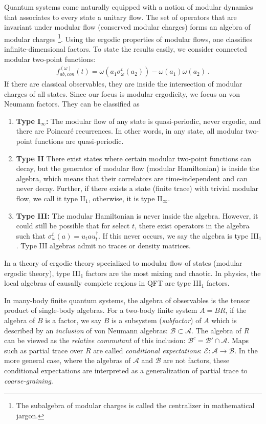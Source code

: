 \documentclass[a4paper,11pt]{article}
\theoremstyle{definition}
\theoremstyle{remark}
\newcommand{\mA}{\mathcal{A}}
\newcommand{\mB}{\mathcal{B}}
\newcommand{\mE}{\mathcal{E}}
\begin{document}
Quantum systems come naturally equipped with a notion of modular dynamics that associates to every state a unitary flow. The set of operators that are invariant under modular flow (conserved modular charges) forms an algebra of modular charges \footnote{The subalgebra of modular charges is called {the centralizer} in mathematical jargon.}. Using the ergodic properties of modular flows, one classifies infinite-dimensional factors. To state the results easily, we consider connected modular two-point functions:
\begin{align}
    f_{ab,con}^{(\omega)}(t)=\omega(a_1 \sigma_\omega^t(a_2))-\omega(a_1)\omega(a_2)\ .
\end{align}
If there are classical observables, they are inside the intersection of modular charges of all states. Since our focus is modular ergodicity, we focus on von Neumann factors. They can be classified as
\begin{enumerate}
    \item {\bf Type I$_\infty$:} The modular flow of any state is quasi-periodic, never ergodic, and there are Poincaré recurrences. In other words, in any state, all modular two-point functions are quasi-periodic.
    \item {\bf Type II} There exist states where certain modular two-point functions can decay, but the generator of modular flow (modular Hamiltonian) is inside the algebra, which means that their correlators are time-independent and can never decay. Further, if there exists a state (finite trace) with trivial modular flow, we call it type II$_1$, otherwise, it is type II$_\infty$. 
    \item {\bf Type III:} The modular Hamiltonian is never inside the algebra. However, it could still be possible that for select $t$, there exist operators in the algebra such that $\sigma_\omega^t(a)=u_t a u_t^\dagger$. If this never occurs, we say the algebra is type III$_1$. Type III algebras admit no traces or density matrices.
\end{enumerate}
In a theory of ergodic theory specialized to modular flow of states (modular ergodic theory), type III$_1$ factors are the most mixing and chaotic. In physics, the local algebras of causally complete regions in QFT are type III$_1$ factors. 


In many-body finite quantum systems, the algebra of observables is the tensor product of single-body algebras. For a two-body finite system $A=BR$, if the algebra of $B$ is a factor, we say $B$ is a subsystem ({\it subfactor}) of $A$ which is described by an {\it inclusion} of von Neumann algebras: $\mB\subset \mA$. The algebra of $R$ can be viewed as the {\it relative commutant} of this inclusion: $\mB^c=\mB'\cap \mA$. Maps such as partial trace over $R$ are called {\it conditional expectations}: $\mE:\mA\to \mB$. In the more general case, where the algebras of $\mA$ and $\mB$ are not factors, these conditional expectations are interpreted as a generalization of partial trace to {\it coarse-graining}. 
\end{document}
